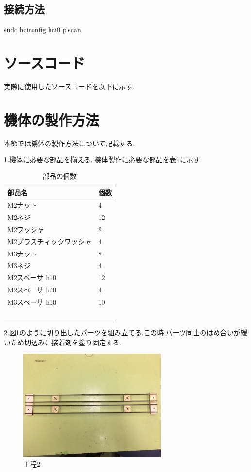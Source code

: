 \documentclass[12pt,oneside]{sotsuken_paper}
\begin{document}
\subsection{接続方法}
sudo hciconfig hci0 piscan

\section{ソースコード}
実際に使用したソースコードを以下に示す.

\section{機体の製作方法}
本節では機体の製作方法について記載する.


1.機体に必要な部品を揃える.
機体製作に必要な部品を表\ref{table:kitai}に示す.

\begin{table}[htbp]
	\begin{center}
		\caption{部品の個数}
		\begin{tabular}{|l|l|} \hline
			部品名 & 個数 \\ \hline 
			M2ナット & 4 \\ \hline
			M2ネジ & 12 \\ \hline
			M2ワッシャ　& 8　\\ \hline
			M2プラスチィックワッシャ & 4\\ \hline
			M3ナット & 8 \\ \hline
			M3ネジ　& 4 \\ \hline
			M2スペーサ h10 & 12 \\ \hline
			M2スペーサ h20 & 4 \\ \hline	
			M3スペーサ h10 & 10 \\ \hline
　　		\end{tabular}
		\label{table:kitai}
	\end{center}
\end{table}


2.図\ref{fig:kitai1}のように切り出したパーツを組み立てる.この時,パーツ同士のはめ合いが緩いため切込みに接着剤を塗り固定する.

\begin{figure}[htbp]
	\begin{center}
		\includegraphics[width=75mm]{image/kitai/kitai1.jpg}
		\caption{工程2}
		\label{fig:kitai1}
	\end{center}
\end{figure}
\end{document}
